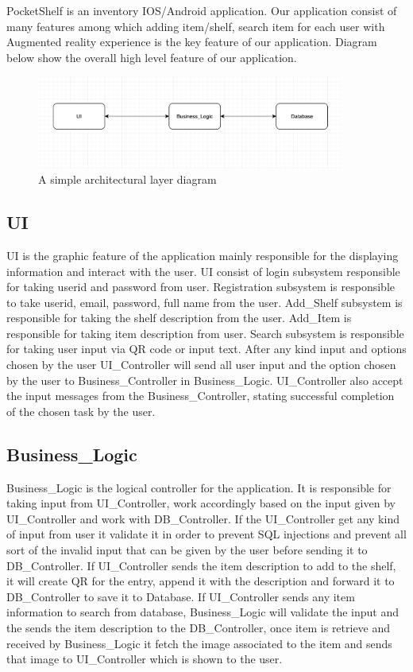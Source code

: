 PocketShelf is an inventory IOS/Android application. Our application consist of many features among which adding item/shelf, search item for each user with Augmented reality experience is the key feature of our application. Diagram below show the overall high level feature of our application.


\begin{figure}[h!]
	\centering
 	\includegraphics[width=0.90\textwidth]{images/overview}
 \caption{A simple architectural layer diagram}
\end{figure}

\subsection{UI}
UI is the graphic feature of the application mainly responsible for the displaying information and interact with the user. UI consist of login subsystem responsible for taking userid and password from user. Registration subsystem is responsible to take userid, email, password, full name from the user. Add\_Shelf subsystem is responsible for taking the shelf description from the user. Add\_Item is responsible for taking item description from user. Search subsystem is responsible for taking user input via QR code or input text. After any kind input and options chosen by the user UI\_Controller will send all user input and the option chosen by the user to Business\_Controller in Business\_Logic. UI\_Controller also accept the input messages from the Business\_Controller, stating successful completion of the chosen task by the user.

\subsection{Business\_Logic}
Business\_Logic is the logical controller for the application. It is responsible for taking input from UI\_Controller, work accordingly based on the input given by UI\_Controller and work with DB\_Controller. If the UI\_Controller get any kind of input from user it validate it in order to prevent SQL injections and prevent all sort of the invalid input that can be given by the user before sending it to DB\_Controller. If UI\_Controller sends the item description to add to the shelf, it will create QR for the entry, append it with the description and forward it to DB\_Controller to save it to Database. If UI\_Controller sends any item information to search from database, Business\_Logic will validate the input and the sends the item description to the DB\_Controller, once item is retrieve and received by Business\_Logic it fetch the image associated to the item and sends that image to UI\_Controller which is shown to the user.


